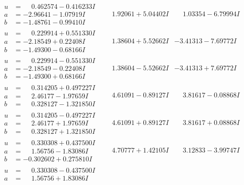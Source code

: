 \documentclass[1p]{elsarticle_modified}
\theoremstyle{definition}
\begin{document}
$$\begin{array}{c|c|c}
\begin{aligned}
u &= \phantom{-}0.462574 - 0.416233 I \\
a &= -2.96641 - 1.07919 I \\
b &= -1.48761 - 0.99410 I\end{aligned}
 & \phantom{-}1.92061 + 5.04402 I & \phantom{-}1.03354 - 6.79994 I \\ \hline\begin{aligned}
u &= \phantom{-}0.229914 + 0.551330 I \\
a &= -2.18549 + 0.22408 I \\
b &= -1.49300 - 0.68166 I\end{aligned}
 & \phantom{-}1.38604 + 5.52662 I & -3.41313 - 7.69772 I \\ \hline\begin{aligned}
u &= \phantom{-}0.229914 - 0.551330 I \\
a &= -2.18549 - 0.22408 I \\
b &= -1.49300 + 0.68166 I\end{aligned}
 & \phantom{-}1.38604 - 5.52662 I & -3.41313 + 7.69772 I \\ \hline\begin{aligned}
u &= \phantom{-}0.314205 + 0.497227 I \\
a &= \phantom{-}2.46177 - 1.97659 I \\
b &= \phantom{-}0.328127 - 1.321850 I\end{aligned}
 & \phantom{-}4.61091 - 0.89127 I & \phantom{-}3.81617 - 0.08868 I \\ \hline\begin{aligned}
u &= \phantom{-}0.314205 - 0.497227 I \\
a &= \phantom{-}2.46177 + 1.97659 I \\
b &= \phantom{-}0.328127 + 1.321850 I\end{aligned}
 & \phantom{-}4.61091 + 0.89127 I & \phantom{-}3.81617 + 0.08868 I \\ \hline\begin{aligned}
u &= \phantom{-}0.330308 + 0.437500 I \\
a &= \phantom{-}1.56756 - 1.83086 I \\
b &= -0.302602 + 0.275810 I\end{aligned}
 & \phantom{-}4.70777 + 1.42105 I & \phantom{-}3.12833 - 3.99747 I \\ \hline\begin{aligned}
u &= \phantom{-}0.330308 - 0.437500 I \\
a &= \phantom{-}1.56756 + 1.83086 I \\

\end{aligned}
\end{array}$$
\end{document}
